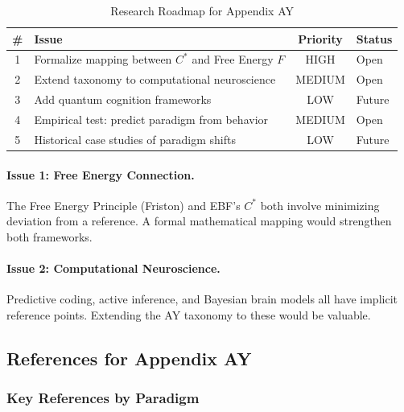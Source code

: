 \begin{table}[htbp]
\centering
\caption{Research Roadmap for Appendix AY}
\label{tab:AY-roadmap}
\renewcommand{\arraystretch}{1.3}
\begin{tabular}{@{}clcl@{}}
\toprule
\textbf{\#} & \textbf{Issue} & \textbf{Priority} & \textbf{Status} \\
\midrule
1 & Formalize mapping between $C^*$ and Free Energy $F$ & HIGH & Open \\
2 & Extend taxonomy to computational neuroscience & MEDIUM & Open \\
3 & Add quantum cognition frameworks & LOW & Future \\
4 & Empirical test: predict paradigm from behavior & MEDIUM & Open \\
5 & Historical case studies of paradigm shifts & LOW & Future \\
\bottomrule
\end{tabular}
\end{table}

\paragraph{Issue 1: Free Energy Connection.}
The Free Energy Principle (Friston) and EBF's $C^*$ both involve minimizing
deviation from a reference. A formal mathematical mapping would strengthen
both frameworks.

\paragraph{Issue 2: Computational Neuroscience.}
Predictive coding, active inference, and Bayesian brain models all have
implicit reference points. Extending the AY taxonomy to these would be valuable.


\subsection{References for Appendix AY}
\label{sec:AY-references}

\subsubsection{Key References by Paradigm}

